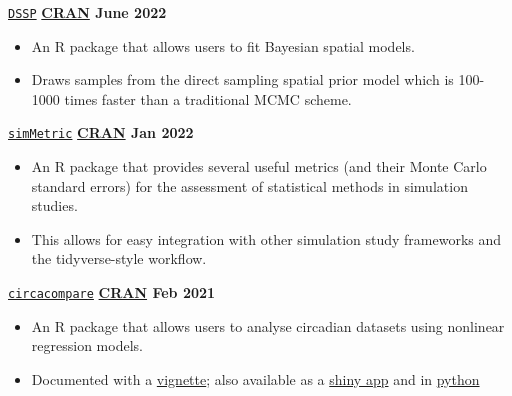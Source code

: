 \texttt{\href{https://github.com/gentrywhite/DSSP}{DSSP}} \hfill \textbf{\href{https://cran.r-project.org/package=DSSP}{CRAN} June 2022} \par
\begin{itemize}
    \item An R package that allows users to fit Bayesian spatial models.
    \item Draws samples from the direct sampling spatial prior model which is 100-1000 times faster than a traditional MCMC scheme.
\end{itemize}

\texttt{\href{https://github.com/RWParsons/simMetric}{simMetric}} \hfill \textbf{\href{https://cran.r-project.org/package=simMetric}{CRAN}  Jan 2022} \par
\begin{itemize}
    \item An R package that provides several useful metrics (and their Monte Carlo standard errors) for the assessment of statistical methods in simulation studies.
    \item This allows for easy integration with other simulation study frameworks and the tidyverse-style workflow.
\end{itemize}

\texttt{\href{https://github.com/RWParsons/circacompare}{circacompare}} \hfill \textbf{\href{https://cran.r-project.org/package=circacompare}{CRAN} Feb 2021} \par
\begin{itemize}
    \item An R package that allows users to analyse circadian datasets using nonlinear regression models.
    \item Documented with a \href{https://cran.r-project.org/web/packages/circacompare/vignettes/circacompare-vignette.html}{vignette}; also available as a \href{https://rwparsons.shinyapps.io/circacompare/}{shiny app} and in \href{https://github.com/RWParsons/circacompare_py}{python}
\end{itemize}
